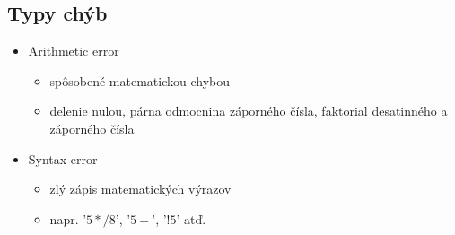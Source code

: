\documentclass[a4paper, 11pt]{article}
\begin{document}
    \subsection{Typy chýb}
    \begin{itemize}
        \item Arithmetic error
        \begin{itemize}
            \item spôsobené matematickou chybou
            \item delenie nulou, párna odmocnina záporného čísla, faktorial desatinného a záporného čísla
        \end{itemize}
        \item Syntax error
        \begin{itemize}
            \item zlý zápis matematických výrazov
            \item napr. '$5*/8$', '$5+$', '$!5$' atď.
        \end{itemize}
    \end{itemize}
\end{document}
